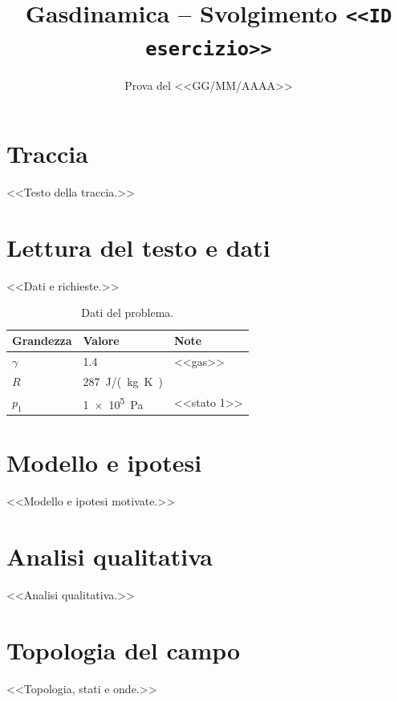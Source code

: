 \documentclass[11pt,a4paper]{article}
\title{Gasdinamica -- Svolgimento \texttt{<<ID esercizio>>}}
\author{}
\date{Prova del <<GG/MM/AAAA>>}
\begin{document}
\maketitle

\section*{Traccia}
<<Testo della traccia.>>

\section{Lettura del testo e dati}
<<Dati e richieste.>>

\begin{table}[H]
  \centering
  \begin{tabular}{lll}
    \toprule
    Grandezza & Valore & Note \\
    \midrule
    $\gamma$ & \num{1.4} & <<gas>> \\
    $R$      & \SI{287}{J/(kg.K)} & \\
    $p_1$    & \SI{1e5}{Pa} & <<stato 1>> \\
    \bottomrule
  \end{tabular}
  \caption{Dati del problema.}
\end{table}

\section{Modello e ipotesi}
<<Modello e ipotesi motivate.>>

\section{Analisi qualitativa}
<<Analisi qualitativa.>>

\section{Topologia del campo}
<<Topologia, stati e onde.>>
\end{document}
